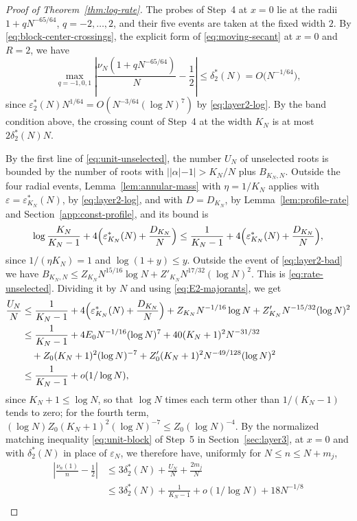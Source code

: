 \begin{proof}[Proof of Theorem~\ref{thm:log-rate}]
The probes of Step~4 at $x=0$ lie at the radii $1+qN^{-65/64}$,
$q=-2,\dots,2$, and their five events are taken at the fixed width $2$.
By \eqref{eq:block-center-crossings}, the explicit form of
\eqref{eq:moving-secant} at $x=0$ and $R=2$, we have
\[
 \max_{q=-1,0,1}
 \left|\frac{\nu_N(1+qN^{-65/64})}{N}-\frac12\right|
 \le\delta_2^*(N)=O\bigl(N^{-1/64}\bigr),
\]
since $\varepsilon_2^*(N)N^{1/64}=O(N^{-3/64}(\log N)^7)$ by
\eqref{eq:layer2-log}. By the band condition above, the crossing count
of Step~4 at the width $K_N$ is at most $2\delta_2^*(N)N$.

By the first line of \eqref{eq:unit-unselected}, the number $U_N$ of
unselected roots is bounded by the number of roots with
$||\alpha|-1|>K_N/N$ plus $B_{K_N,N}$. Outside the four radial events,
Lemma~\ref{lem:annular-mass} with $\eta=1/K_N$ applies with
$\varepsilon=\varepsilon_{K_N}^*(N)$, by \eqref{eq:layer2-log}, and with
$D=D_{K_N}$, by Lemma~\ref{lem:profile-rate} and
Section~\ref{app:const-profile}, and its bound is
\[
 \log\frac{K_N}{K_N-1}+4\Bigl(\varepsilon_{K_N}^*(N)+\frac{D_{K_N}}N\Bigr)
 \le\frac1{K_N-1}+4\Bigl(\varepsilon_{K_N}^*(N)+\frac{D_{K_N}}N\Bigr),
\]
since $1/(\eta K_N)=1$ and $\log(1+y)\le y$.
Outside the event of \eqref{eq:layer2-bad} we have
$B_{K_N,N}\le Z_{K_N}N^{15/16}\log N+Z'_{K_N}N^{17/32}(\log N)^2$.
This is \eqref{eq:rate-unselected}. Dividing it by $N$ and
using \eqref{eq:E2-majorants}, we get
\begin{align*}
 \frac{U_N}{N}
 &\le\frac1{K_N-1}+4\Bigl(\varepsilon_{K_N}^*(N)+\frac{D_{K_N}}N\Bigr)
  +Z_{K_N}N^{-1/16}\log N+Z'_{K_N}N^{-15/32}(\log N)^2\\
 &\le\frac1{K_N-1}+4E_0N^{-1/16}(\log N)^7+40(K_N+1)^2N^{-31/32}\\
 &\quad+Z_0(K_N+1)^2(\log N)^{-7}+Z'_0(K_N+1)^2N^{-49/128}(\log N)^2\\
 &\le\frac1{K_N-1}+o(1/\log N),
\end{align*}
since $K_N+1\le\log N$, so that $\log N$ times each term other than
$1/(K_N-1)$ tends to zero; for the fourth term,
$(\log N)Z_0(K_N+1)^2(\log N)^{-7}\le Z_0(\log N)^{-4}$.
By the normalized matching inequality \eqref{eq:unit-block} of Step~5 in
Section~\ref{sec:layer3}, at $x=0$ and with $\delta_2^*(N)$ in place of
$\varepsilon_N$, we therefore have, uniformly for $N\le n\le N+m_j$,
\begin{align*}
 \left|\frac{\nu_n(1)}n-\frac12\right|
 &\le3\delta_2^*(N)+\frac{U_N}{N}+\frac{2m_j}{N}\\
 &\le3\delta_2^*(N)+\frac1{K_N-1}+o(1/\log N)+18N^{-1/8}\\

\end{align*}
\end{proof}
